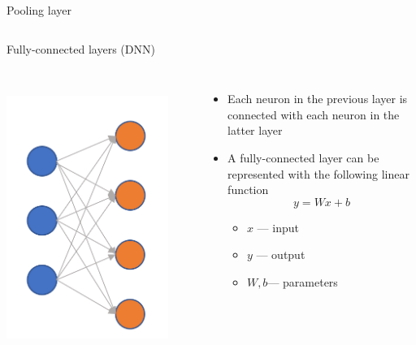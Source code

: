 \documentclass{beamer}
\begin{document}
\begin{CJK*}{UTF8}{gbsn}
\begin{frame}{Pooling layer}
\begin{columns}
\begin{column}{0.5\textwidth}
\end{column}
\end{columns}
\end{frame}


\begin{frame}{Fully-connected layers (DNN)}
\begin{columns}
\includegraphics[width=\textwidth]{figures/FC}
\begin{minipage}[c][0.45\textheight][c]{\linewidth} 
\begin{itemize}
\item Each neuron in the previous layer is connected with each neuron in the latter layer 
\item A fully-connected layer can be represented with the following linear function
$$y=Wx+b$$
\begin{itemize}
\item $x$ --- input
\item $y$ --- output
\item $W,b$--- parameters


\end{itemize}
\end{itemize}
\end{minipage}
\end{columns}
\end{frame}
\end{CJK*}
\end{document}
